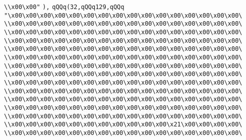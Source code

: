 \verb|\\x00\x00"|\newline
\verb|),|\newline
\verb|qQQq(32,qQQq129,qQQq|\newline
\verb|"\x00\x00\x00\x00\x00\x00\x00\x00\x00\x00\x00\x00\x00\x00\x00\x00\|\newline
\verb|\\x00\x00\x00\x00\x00\x00\x00\x00\x00\x00\x00\x00\x00\x00\x00\x00\|\newline
\verb|\\x00\x00\x00\x00\x00\x00\x00\x00\x00\x00\x00\x00\x00\x00\x00\x00\|\newline
\verb|\\x00\x00\x00\x00\x00\x00\x00\x00\x00\x00\x00\x00\x00\x00\x00\x00\|\newline
\verb|\\x00\x00\x00\x00\x00\x00\x00\x00\x00\x00\x00\x00\x00\x00\x00\x00\|\newline
\verb|\\x00\x00\x00\x00\x00\x00\x00\x00\x00\x00\x00\x00\x00\x00\x00\x00\|\newline
\verb|\\x00\x00\x00\x00\x00\x00\x00\x00\x00\x00\x00\x00\x00\x00\x00\x00\|\newline
\verb|\\x00\x00\x00\x00\x00\x00\x00\x00\x00\x00\x00\x00\x00\x00\x00\x00\|\newline
\verb|\\x00\x00\x00\x00\x00\x00\x00\x00\x00\x00\x00\x00\x00\x00\x00\x00\|\newline
\verb|\\x00\x00\x00\x00\x00\x00\x00\x00\x00\x00\x00\x00\x00\x00\x00\x00\|\newline
\verb|\\x00\x00\x00\x00\x00\x00\x00\x00\x00\x00\x00\x00\x00\x00\x00\x00\|\newline
\verb|\\x00\x00\x00\x00\x00\x00\x00\x00\x00\x00\x00\x00\x00\x00\x00\x00\|\newline
\verb|\\x00\x00\x00\x00\x00\x00\x00\x00\x00\x00\x00\x00\x00\x00\x00\x00\|\newline
\verb|\\x00\x00\x00\x00\x00\x00\x00\x00\x00\x00\x00\x21\x00\x00\x00\x00\|\newline
\verb|\\x00\x00\x00\x00\x00\x00\x00\x00\x00\x00\x00\x00\x00\x00\x00\x00\|\newline
